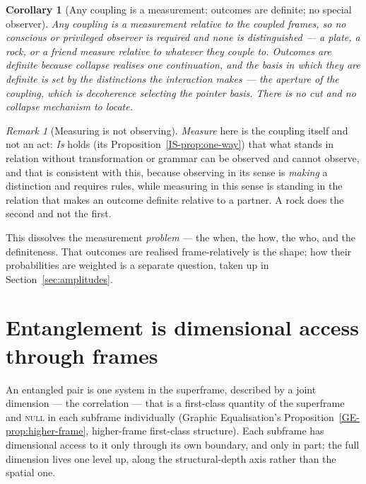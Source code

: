 \documentclass[11pt,a4paper]{article}
\newtheorem{corollary}[definition]{Corollary}
\theoremstyle{remark}\newtheorem{remark}[definition]{Remark}
\begin{document}
\begin{corollary}[Any coupling is a measurement; outcomes are definite; no special observer]\label{cor:observer}
Any coupling is a measurement relative to the coupled frames, so no conscious or
privileged observer is required and none is distinguished --- a plate, a rock, or
a friend measure relative to whatever they couple to. Outcomes are definite
because collapse realises \emph{one} continuation, and the basis in which they are
definite is set by the distinctions the interaction makes --- the aperture of the
coupling, which is decoherence selecting the pointer basis. There is no cut and
no collapse mechanism to locate.
\end{corollary}

\begin{remark}[Measuring is not observing]\label{rem:measure-not-observe}
\emph{Measure} here is the
coupling itself and not an act: \emph{Is} holds (its Proposition~\ref{IS-prop:one-way}) that what
stands in relation without transformation or grammar can be observed and cannot observe,
and that is consistent with this, because observing in its sense is \emph{making}
a distinction and requires rules, while measuring in this sense is standing in the
relation that makes an outcome definite relative to a partner. A rock does the
second and not the first.
\end{remark}

This dissolves the measurement \emph{problem} --- the when, the how, the who, and
the definiteness. That outcomes are realised frame-relatively is the shape; how
their probabilities are weighted is a separate question, taken up in
Section~\ref{sec:amplitudes}.

\section{Entanglement is dimensional access through frames}\label{sec:entanglement}
An entangled pair is one system in the superframe, described by a joint dimension
--- the correlation --- that is a first-class quantity of the superframe and
\textsc{null} in each subframe individually (Graphic Equalisation's
Proposition~\ref{GE-prop:higher-frame}, higher-frame first-class structure). Each subframe has dimensional access to it only through
its own boundary, and only in part; the full dimension lives one level up, along
the structural-depth axis rather than the spatial one.
\end{document}
